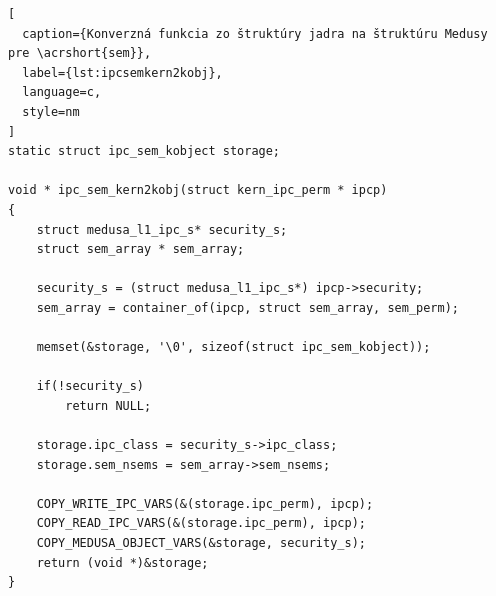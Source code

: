 \begin{lstlisting}[
  caption={Konverzná funkcia zo štruktúry jadra na štruktúru Medusy pre \acrshort{sem}},
  label={lst:ipcsemkern2kobj},
  language=c,
  style=nm
]
static struct ipc_sem_kobject storage;

void * ipc_sem_kern2kobj(struct kern_ipc_perm * ipcp)
{
	struct medusa_l1_ipc_s* security_s;
	struct sem_array * sem_array;

	security_s = (struct medusa_l1_ipc_s*) ipcp->security;
	sem_array = container_of(ipcp, struct sem_array, sem_perm);
	
	memset(&storage, '\0', sizeof(struct ipc_sem_kobject));
	
	if(!security_s)
		return NULL;
	
	storage.ipc_class = security_s->ipc_class;
	storage.sem_nsems = sem_array->sem_nsems;
	
	COPY_WRITE_IPC_VARS(&(storage.ipc_perm), ipcp);
	COPY_READ_IPC_VARS(&(storage.ipc_perm), ipcp);
	COPY_MEDUSA_OBJECT_VARS(&storage, security_s);
	return (void *)&storage;
}
\end{lstlisting}

